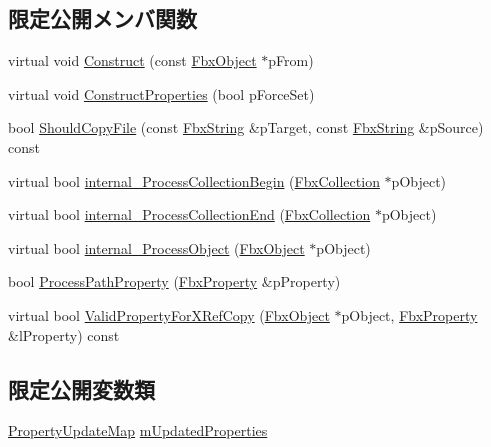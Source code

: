 \subsection*{限定公開メンバ関数}
\begin{DoxyCompactItemize}
\item 
virtual void \hyperlink{class_fbx_processor_x_ref_copy_a025831c438813ebe4ef619ea5b00d2fd}{Construct} (const \hyperlink{class_fbx_object}{Fbx\+Object} $\ast$p\+From)
\item 
virtual void \hyperlink{class_fbx_processor_x_ref_copy_afccc4a20df6bee60d5ce2a7a9ca11666}{Construct\+Properties} (bool p\+Force\+Set)
\item 
bool \hyperlink{class_fbx_processor_x_ref_copy_a9457667850d550b1ccf1f848434f44c5}{Should\+Copy\+File} (const \hyperlink{class_fbx_string}{Fbx\+String} \&p\+Target, const \hyperlink{class_fbx_string}{Fbx\+String} \&p\+Source) const
\item 
virtual bool \hyperlink{class_fbx_processor_x_ref_copy_ada78e119a176edb65c40cbb787699d83}{internal\+\_\+\+Process\+Collection\+Begin} (\hyperlink{class_fbx_collection}{Fbx\+Collection} $\ast$p\+Object)
\item 
virtual bool \hyperlink{class_fbx_processor_x_ref_copy_ab85bf2d36c443dff93731836493cdfdf}{internal\+\_\+\+Process\+Collection\+End} (\hyperlink{class_fbx_collection}{Fbx\+Collection} $\ast$p\+Object)
\item 
virtual bool \hyperlink{class_fbx_processor_x_ref_copy_a268311daf5a2a29fc7bd2097d8346e5f}{internal\+\_\+\+Process\+Object} (\hyperlink{class_fbx_object}{Fbx\+Object} $\ast$p\+Object)
\item 
bool \hyperlink{class_fbx_processor_x_ref_copy_af29ec1373d66383d6b9140421c4c0166}{Process\+Path\+Property} (\hyperlink{class_fbx_property}{Fbx\+Property} \&p\+Property)
\item 
virtual bool \hyperlink{class_fbx_processor_x_ref_copy_a528c9b217f22eb04f68d3687774a18fd}{Valid\+Property\+For\+X\+Ref\+Copy} (\hyperlink{class_fbx_object}{Fbx\+Object} $\ast$p\+Object, \hyperlink{class_fbx_property}{Fbx\+Property} \&l\+Property) const
\end{DoxyCompactItemize}
\subsection*{限定公開変数類}
\begin{DoxyCompactItemize}
\item 
\hyperlink{class_fbx_processor_x_ref_copy_af0408f51b60aa6c9fb8aab6e73f57eb7}{Property\+Update\+Map} \hyperlink{class_fbx_processor_x_ref_copy_ac42ed09834ba503d47e328d8c9734131}{m\+Updated\+Properties}
\end{DoxyCompactItemize}
